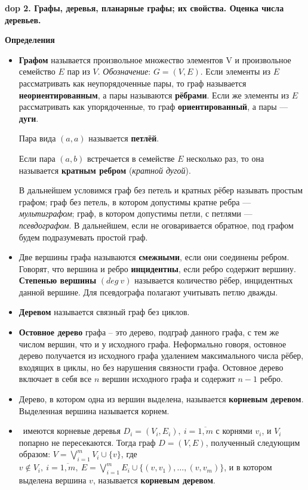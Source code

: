 \textbf{\LARGE dop 2. Графы,  деревья,  планарные графы;  их свойства.  Оценка числа деревьев.}

\textbf{Определения}
\begin{itemize}
\item \textbf{Графом} называется произвольное множество элементов V и произвольное семейство $E$ пар из $V$. \textit{Обозначение}: $G = (V, E)$.
Если элементы из $E$ рассматривать как неупорядоченные пары, то граф называется \textbf{неориентированным}, а пары называются \textbf{рёбрами}. 
Если же элементы из $E$ рассматривать как упорядоченные, то граф \textbf{ориентированный}, а пары --- \textbf{дуги}.

Пара вида $(a, a)$ называется \textbf{петлёй}.

Если пара $(a, b)$ встречается в семействе $E$ несколько раз, то она называется \textbf{кратным ребром} (\textit{кратной дугой}).


В дальнейшем условимся граф без петель и кратных рёбер называть простым графом; граф без петель, в котором допустимы кратне ребра --- \textit{мультиграфом}; граф, в котором допустимы петли, с петлями --- \textit{псевдографом}. В дальнейшем, если не оговаривается обратное, под графом будем подразумевать простой граф.

\item Две вершины графа называются \textbf{смежными}, если они соединены ребром. Говорят, что вершина и ребро \textbf{инцидентны}, если ребро содержит вершину. \textbf{Степенью вершины} $(deg~v)$ называется количество рёбер, инцидентных данной вершине. Для псевдографа полагают учитывать петлю дважды.

\item \textbf{Деревом} называется связный граф без циклов. %

\item \textbf{Остовное дерево} графа -- это дерево, подграф данного графа, с тем же числом вершин, что и у исходного графа. Неформально говоря, остовное дерево получается из исходного графа удалением максимального числа рёбер, входящих в циклы, но без нарушения связности графа. Остовное дерево включает в себя все $n$ вершин исходного графа и содержит $n-1$ ребро.


\item  Дерево, в котором одна из вершин выделена, называется \textbf{корневым деревом}. Выделенная вершина называется корнем.

\item \mathLet \ имеются корневые деревья $D_i = (V_i , E_i),~i = \overline{1,m}$ с корнями $v_i$, и $V_i$ попарно не пересекаются. 
Тогда граф $D = (V, E)$, полученный следующим образом: $V = \bigvee^m_{i=1} V_i \cup \{v\}$, где $v \notin V_i,~i = \overline{1,m},~E = \bigvee^m_{i=1} E_i \cup \{(v, v_1), \dots, (v, v_m)\}$, и в котором выделена вершина $v$, называется \textbf{корневым деревом}.


\end{itemize}
